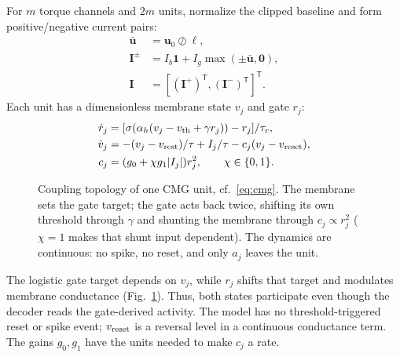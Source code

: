 \documentclass[letterpaper, 10 pt, conference]{ieeeconf}
\newcommand{\T}{^{\mathsf T}}
\begin{document}
For $m$ torque channels and $2m$ units, normalize the clipped baseline and
form positive/negative current pairs:
\begin{equation}
 \begin{aligned}
 \bar{\bm u}&=\bm u_0\oslash\bm\ell,\\
 \bm I^{\pm}&=I_b\bm1+I_g\max(\pm\bar{\bm u},\bm0),\\
 \bm I&=[(\bm I^+)\T,(\bm I^-)\T]\T.
 \end{aligned}
 \label{eq:encoding}
\end{equation}
Each unit has a dimensionless membrane state $v_j$ and gate $r_j$:
\begin{align}
 \dot r_j&=[\sigma(\alpha_h(v_j-v_{\rm th}+\gamma r_j))-r_j]/\tau_r,\\
 \dot v_j&=-(v_j-v_{\rm rest})/\tau+I_j/\tau-c_j(v_j-v_{\rm reset}),\\
 c_j&=(g_0+\chi g_1|I_j|)r_j^2,\qquad \chi\in\{0,1\}.
 \label{eq:cmg}
\end{align}
\begin{figure}[t]
\centering
\resizebox{0.86\columnwidth}{!}{}
\caption{Coupling topology of one CMG unit, cf.~\eqref{eq:cmg}. The
membrane sets the gate target; the gate acts back twice, shifting its own
threshold through $\gamma$ and shunting the membrane through
$c_j\propto r_j^2$ ($\chi=1$ makes that shunt input dependent). The
dynamics are continuous: no spike, no reset, and only $a_j$ leaves the
unit.}
\label{fig:cmgunit}
\end{figure}
%
The logistic gate target depends on $v_j$, while $r_j$ shifts that target
and modulates membrane conductance (Fig.~\ref{fig:cmgunit}). Thus, both states participate even
though the decoder reads the gate-derived activity. The model has no
threshold-triggered reset or spike event; $v_{\rm reset}$ is a reversal
level in a continuous conductance term. The gains $g_0,g_1$ have the units
needed to make $c_j$ a rate.
\end{document}
